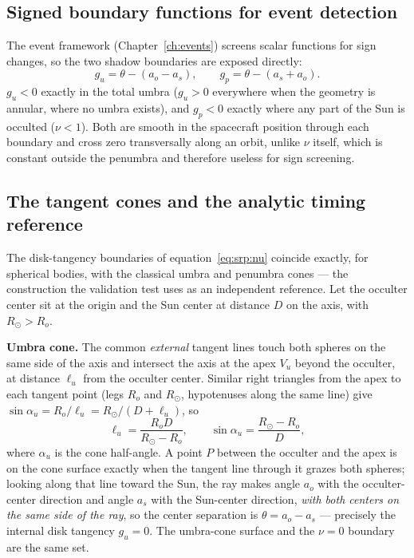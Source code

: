 \subsection{Signed boundary functions for event detection}

The event framework (Chapter~\ref{ch:events}) screens scalar functions
for sign changes, so the two shadow boundaries are exposed directly:
\begin{equation}
  g_{u} = \theta - (a_{o} - a_{s}),
  \qquad
  g_{p} = \theta - (a_{s} + a_{o}).
  \label{eq:srp:boundaries}
\end{equation}
$g_{u} < 0$ exactly in the total umbra ($g_{u} > 0$ everywhere when the
geometry is annular, where no umbra exists), and $g_{p} < 0$ exactly
where any part of the Sun is occulted ($\nu < 1$). Both are smooth in
the spacecraft position through each boundary and cross zero
transversally along an orbit, unlike $\nu$ itself, which is constant
outside the penumbra and therefore useless for sign screening.

\subsection{The tangent cones and the analytic timing reference}
\label{sec:srp:cones}

The disk-tangency boundaries of equation~\eqref{eq:srp:nu} coincide
exactly, for spherical bodies, with the classical umbra and penumbra
cones --- the construction the validation test uses as an independent
reference. Let the occulter center sit at the origin and the Sun center
at distance $D$ on the axis, with $R_{\odot} > R_{o}$.

\textbf{Umbra cone.} The common \emph{external} tangent lines touch
both spheres on the same side of the axis and intersect the axis at the
apex $V_{u}$ beyond the occulter, at distance $\ell_{u}$ from the
occulter center. Similar right triangles from the apex to each tangent
point (legs $R_{o}$ and $R_{\odot}$, hypotenuses along the same line)
give $\sin\alpha_{u} = R_{o}/\ell_{u} = R_{\odot}/(D + \ell_{u})$, so
\begin{equation}
  \ell_{u} = \frac{R_{o} D}{R_{\odot} - R_{o}},
  \qquad
  \sin\alpha_{u} = \frac{R_{\odot} - R_{o}}{D},
  \label{eq:srp:umbracone}
\end{equation}
where $\alpha_{u}$ is the cone half-angle. A point $P$ between the
occulter and the apex is on the cone surface exactly when the
tangent line through it grazes both spheres; looking along that line
toward the Sun, the ray makes angle $a_{o}$ with the occulter-center
direction and angle $a_{s}$ with the Sun-center direction, \emph{with
both centers on the same side of the ray}, so the center separation is
$\theta = a_{o} - a_{s}$ --- precisely the internal disk tangency
$g_{u} = 0$. The umbra-cone surface and the $\nu = 0$ boundary are the
same set.

